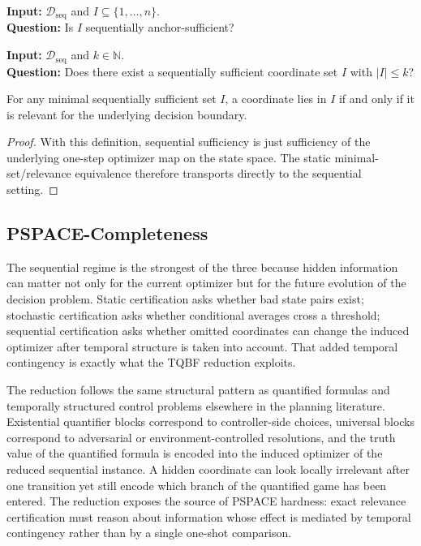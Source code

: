 \begin{problem}\label{prob:sequential-anchor-sufficiency}
\textbf{Input:} $\mathcal{D}_{\mathrm{seq}}$ and $I\subseteq\{1,\ldots,n\}$. \\
\textbf{Question:} Is $I$ sequentially anchor-sufficient?
\end{problem}

\begin{problem}\label{prob:sequential-minimum-sufficient}
\textbf{Input:} $\mathcal{D}_{\mathrm{seq}}$ and $k\in\mathbb{N}$. \\
\textbf{Question:} Does there exist a sequentially sufficient coordinate set $I$ with $|I|\le k$?
\end{problem}

\begin{proposition}\label{prop:sequential-minimal-relevant}
For any minimal sequentially sufficient set $I$, a coordinate lies in $I$ if and only if it is relevant for the underlying decision boundary.
\end{proposition}


\begin{proof}
With this definition, sequential sufficiency is just sufficiency of the underlying one-step optimizer map on the state space. The static minimal-set/relevance equivalence therefore transports directly to the sequential setting.
\end{proof}

\subsection{PSPACE-Completeness}

The sequential regime is the strongest of the three because hidden information can matter not only for the current optimizer but for the future evolution of the decision problem. Static certification asks whether bad state pairs exist; stochastic certification asks whether conditional averages cross a threshold; sequential certification asks whether omitted coordinates can change the induced optimizer after temporal structure is taken into account. That added temporal contingency is exactly what the TQBF reduction exploits.

The reduction follows the same structural pattern as quantified formulas and temporally structured control problems elsewhere in the planning literature. Existential quantifier blocks correspond to controller-side choices, universal blocks correspond to adversarial or environment-controlled resolutions, and the truth value of the quantified formula is encoded into the induced optimizer of the reduced sequential instance. A hidden coordinate can look locally irrelevant after one transition yet still encode which branch of the quantified game has been entered. The reduction exposes the source of PSPACE hardness: exact relevance certification must reason about information whose effect is mediated by temporal contingency rather than by a single one-shot comparison.

